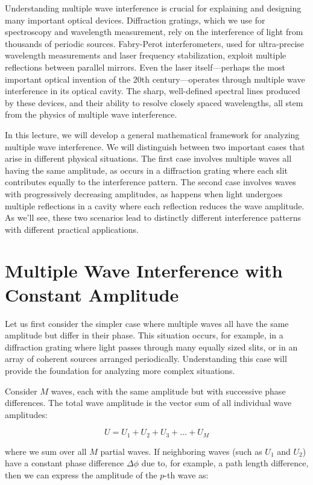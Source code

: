 \documentclass[
  a4paper,
]{book}
\begin{document}
Understanding multiple wave interference is crucial for explaining and
designing many important optical devices. Diffraction gratings, which we
use for spectroscopy and wavelength measurement, rely on the
interference of light from thousands of periodic sources. Fabry-Perot
interferometers, used for ultra-precise wavelength measurements and
laser frequency stabilization, exploit multiple reflections between
parallel mirrors. Even the laser itself---perhaps the most important
optical invention of the 20th century---operates through multiple wave
interference in its optical cavity. The sharp, well-defined spectral
lines produced by these devices, and their ability to resolve closely
spaced wavelengths, all stem from the physics of multiple wave
interference.

In this lecture, we will develop a general mathematical framework for
analyzing multiple wave interference. We will distinguish between two
important cases that arise in different physical situations. The first
case involves multiple waves all having the same amplitude, as occurs in
a diffraction grating where each slit contributes equally to the
interference pattern. The second case involves waves with progressively
decreasing amplitudes, as happens when light undergoes multiple
reflections in a cavity where each reflection reduces the wave
amplitude. As we'll see, these two scenarios lead to distinctly
different interference patterns with different practical applications.

\section{Multiple Wave Interference with Constant
Amplitude}\label{multiple-wave-interference-with-constant-amplitude}

Let us first consider the simpler case where multiple waves all have the
same amplitude but differ in their phase. This situation occurs, for
example, in a diffraction grating where light passes through many
equally sized slits, or in an array of coherent sources arranged
periodically. Understanding this case will provide the foundation for
analyzing more complex situations.

Consider \(M\) waves, each with the same amplitude but with successive
phase differences. The total wave amplitude is the vector sum of all
individual wave amplitudes:

\[
U=U_1+U_2+U_3+\ldots+U_M
\]

where we sum over all \(M\) partial waves. If neighboring waves (such as
\(U_1\) and \(U_2\)) have a constant phase difference \(\Delta \phi\)
due to, for example, a path length difference, then we can express the
amplitude of the \(p\)-th wave as:
\end{document}
